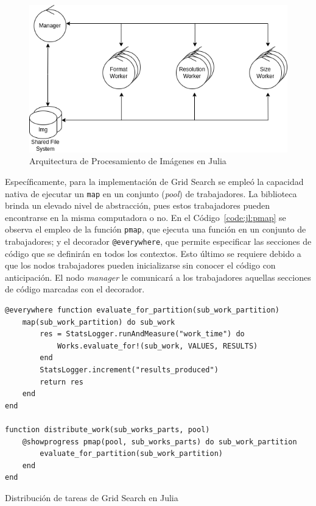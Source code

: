 \documentclass[11pt]{article}
\newcommand{\english}[1]{\textit{#1}}
\begin{document}
\begin{figure}[ht]
    \centering
    \includegraphics[scale=0.4]{resources/distributed_systems/jl/image_processing_arch.png}
    \caption{Arquitectura de Procesamiento de Imágenes en Julia}
    \label{fig:jl:image_processing_arch}
\end{figure}

Específicamente, para la implementación de Grid Search se empleó la capacidad nativa de ejecutar un \lstinline{map} en un conjunto (\english{pool}) de trabajadores. La biblioteca brinda un elevado nivel de abstracción, pues estos trabajadores pueden encontrarse en la misma computadora o no. En el Código~\ref{code:jl:pmap} se observa el empleo de la función \lstinline{pmap}, que ejecuta una función en un conjunto de trabajadores; y el decorador \lstinline{@everywhere}, que permite especificar las secciones de código que se definirán en todos los contextos. Esto último se requiere debido a que los nodos trabajadores pueden inicializarse sin conocer el código con anticipación. El nodo \english{manager} le comunicará a los trabajadores aquellas secciones de código marcadas con el decorador.

\begin{listing}[ht]
\begin{verbatim}
@everywhere function evaluate_for_partition(sub_work_partition)
    map(sub_work_partition) do sub_work
        res = StatsLogger.runAndMeasure("work_time") do
            Works.evaluate_for!(sub_work, VALUES, RESULTS)
        end
        StatsLogger.increment("results_produced")
        return res
    end
end

function distribute_work(sub_works_parts, pool)
    @showprogress pmap(pool, sub_works_parts) do sub_work_partition
        evaluate_for_partition(sub_work_partition)
    end
end
\end{verbatim}
\caption{Distribución de tareas de Grid Search en Julia}
\label{code:jl:pmap}
\end{listing}
\end{document}
